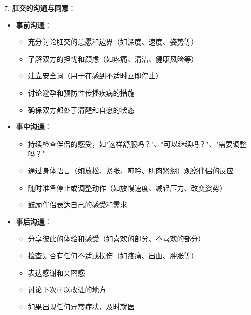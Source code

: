 \documentclass[12pt,UTF8]{ctexbook}
\begin{document}
7. \textbf{肛交的沟通与同意}：
\begin{itemize}
	\item \textbf{事前沟通}：
	\begin{itemize}
		\item 充分讨论肛交的意愿和边界（如深度、速度、姿势等）
		\item 了解双方的担忧和顾虑（如疼痛、清洁、健康风险等）
		\item 建立安全词（用于在感到不适时立即停止）
		\item 讨论避孕和预防性传播疾病的措施
		\item 确保双方都处于清醒和自愿的状态
	\end{itemize}
	\item \textbf{事中沟通}：
	\begin{itemize}
		\item 持续检查伴侣的感受，如"这样舒服吗？"、"可以继续吗？"、"需要调整吗？"
		\item 通过身体语言（如放松、紧张、呻吟、肌肉紧绷）观察伴侣的反应
		\item 随时准备停止或调整动作（如放慢速度、减轻压力、改变姿势）
		\item 鼓励伴侣表达自己的感受和需求
	\end{itemize}
	\item \textbf{事后沟通}：
	\begin{itemize}
		\item 分享彼此的体验和感受（如喜欢的部分、不喜欢的部分）
		\item 检查是否有任何不适或损伤（如疼痛、出血、肿胀等）
		\item 表达感谢和亲密感
		\item 讨论下次可以改进的地方
		\item 如果出现任何异常症状，及时就医
	\end{itemize}
\end{itemize}
\end{document}
